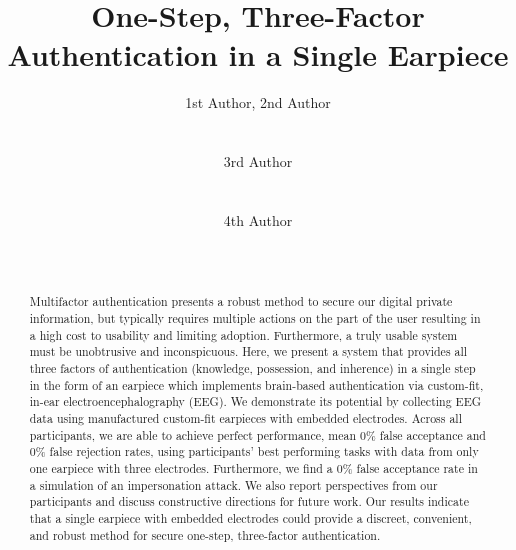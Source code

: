 \documentclass{sigchi}
\begin{document}
\title{One-Step, Three-Factor Authentication in a Single Earpiece}

\author{
  \alignauthor 1st Author, 2nd Author\\
    \\
    \\
  \alignauthor 3rd Author\\
    \\
    \\
  \alignauthor 4th Author\\
    \\
    \\
}

\maketitle

\begin{abstract}
 Multifactor authentication presents a robust method to secure our digital private information, but typically requires multiple actions on the part of the user resulting in a high cost to usability and limiting adoption. Furthermore, a truly usable system must be unobtrusive and inconspicuous. Here, we present a system that provides all three factors of authentication (knowledge, possession, and inherence) in a single step in the form of an earpiece which implements brain-based authentication via custom-fit, in-ear electroencephalography (EEG). We demonstrate its potential by collecting EEG data using manufactured custom-fit earpieces with embedded electrodes. Across all participants, we are able to achieve perfect performance, mean 0\% false acceptance and 0\% false rejection rates, using participants' best performing tasks with data from only one earpiece with three electrodes. Furthermore, we find a 0\% false acceptance rate in a simulation of an impersonation attack. We also report perspectives from our participants and discuss constructive directions for future work. Our results indicate that a single earpiece with embedded electrodes could provide a discreet, convenient, and robust method for secure one-step, three-factor authentication.
\end{abstract}


\end{document}
